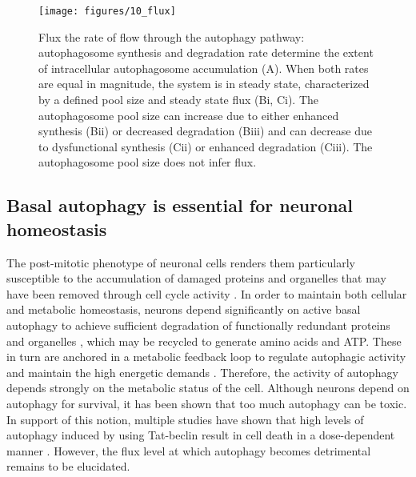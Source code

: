 \begin{figure}[h!]
  \center
  \texttt{[image: figures/10\_flux]}
  \caption{Flux the rate of flow through the autophagy pathway: autophagosome synthesis and degradation rate determine the extent of intracellular autophagosome accumulation (A). When both rates are equal in magnitude, the system is in steady state, characterized by a defined pool size and steady state flux (Bi, Ci). The autophagosome pool size can increase due to either enhanced synthesis (Bii) or decreased degradation (Biii) and can decrease due to dysfunctional synthesis (Cii) or enhanced degradation (Ciii). The autophagosome pool size does not infer flux. }
  \label{fig:10_flux}
\end{figure}

\subsection{Basal autophagy is essential for neuronal homeostasis}
The post-mitotic phenotype of neuronal cells renders them particularly susceptible to the accumulation of damaged proteins and organelles that may have been removed through cell cycle activity \citep{Liang2014,Tan2014}. In order to maintain both cellular and metabolic homeostasis, neurons depend significantly on active basal autophagy to achieve sufficient degradation of functionally redundant proteins and organelles \citep{Meijer2009}, which may be recycled to generate amino acids and ATP. These in turn are anchored in a metabolic feedback loop to regulate autophagic activity and maintain the high energetic demands \citep{Loos2013}. Therefore, the activity of autophagy depends strongly on the metabolic status of the cell. Although neurons depend on autophagy for survival, it has been shown that too much autophagy can be toxic. In support of this notion, multiple studies have shown that high levels of autophagy induced by using Tat-beclin result in cell death in a dose-dependent manner \citep{Liu2013,Liu2015}. However, the flux level at which autophagy becomes detrimental remains to be elucidated. 

